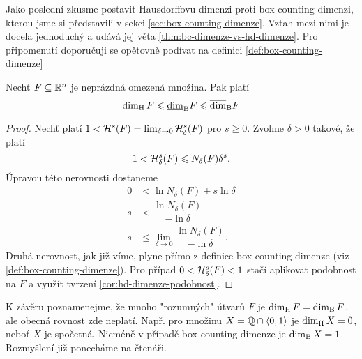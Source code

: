 Jako poslední zkusme postavit Hausdorffovu dimenzi proti box-counting dimenzi, kterou jsme si představili v sekci \ref{sec:box-counting-dimenze}. Vztah mezi nimi je docela jednoduchý a udává jej věta \ref{thm:bc-dimenze-vs-hd-dimenze}. Pro připomenutí doporučuji se opětovně podívat na definici \ref{def:box-counting-dimenze}
\begin{theorem}\label{thm:bc-dimenze-vs-hd-dimenze}
    Nechť $F\subseteq\mathbb{R}^n$ je neprázdná omezená množina. Pak platí
    \[\operatorname{dim_H}{F}\leqslant\underline{\dim}_\textup{B}{F}\leqslant\overline{\dim}_\textup{B}{F}\]
\end{theorem}
\begin{proof}
    Nechť platí $1<\mathcal{H}^{s}(F)=\lim_{\delta\to 0}\mathcal{H}_{\delta}^{s}(F)$ pro $s\geqslant 0$. Zvolme $\delta>0$ takové, že platí
    \[1<\mathcal{H}_{\delta}^{s}(F)\leqslant N_\delta(F)\delta^s.\]
    Úpravou této nerovnosti dostaneme
    \begin{align*}
        0&<\ln{N_\delta(F)}+s\ln{\delta}\\
        s&<\dfrac{\ln{N_\delta(F)}}{-\ln{\delta}}\\
        s&\leqslant\lim_{\delta\to 0}\dfrac{\ln{N_\delta(F)}}{-\ln{\delta}}.
    \end{align*}
    Druhá nerovnost, jak již víme, plyne přímo z definice box-counting dimenze (viz \ref{def:box-counting-dimenze}). Pro případ $0<\mathcal{H}_{\delta}^{s}(F)<1$ stačí aplikovat podobnost na $F$ a využít tvrzení \ref{cor:hd-dimenze-podobnost}.
\end{proof}

K závěru poznamenejme, že mnoho "rozumných" útvarů $F$ je $\operatorname{dim_H}{F}=\operatorname{dim_B}{F}$, ale obecná rovnost zde neplatí. Např. pro množinu $X=\mathbb{Q}\cap\langle0,1\rangle$ je $\operatorname{dim_H}{X}=0$, neboť $X$ je spočetná. Nicméně v případě box-counting dimenze je $\operatorname{dim_B}{X}=1$. Rozmyšlení již ponecháme na čtenáři.